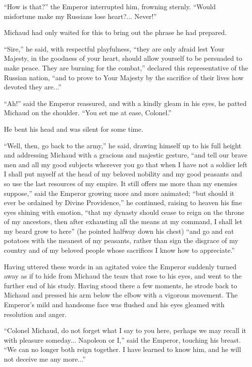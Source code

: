 ``How is that?'' the Emperor interrupted him, frowning
sternly. ``Would misfortune make my Russians lose
heart?... Never!''

Michaud had only waited for this to bring out the phrase he had
prepared.

``Sire,'' he said, with respectful playfulness, ``they are only
afraid lest Your Majesty, in the goodness of your heart, should
allow yourself to be persuaded to make peace. They are burning
for the combat,'' declared this representative of the Russian
nation, ``and to prove to Your Majesty by the sacrifice of their
lives how devoted they are...''

``Ah!'' said the Emperor reassured, and with a kindly gleam in
his eyes, he patted Michaud on the shoulder. ``You set me at
ease, Colonel.''

He bent his head and was silent for some time.

``Well, then, go back to the army,'' he said, drawing himself up
to his full height and addressing Michaud with a gracious and
majestic gesture, ``and tell our brave men and all my good
subjects wherever you go that when I have not a soldier left I
shall put myself at the head of my beloved nobility and my good
peasants and so use the last resources of my empire. It still
offers me more than my enemies suppose,'' said the Emperor
growing more and more animated; ``but should it ever be ordained
by Divine Providence,'' he continued, raising to heaven his fine
eyes shining with emotion, ``that my dynasty should cease to
reign on the throne of my ancestors, then after exhausting all
the means at my command, I shall let my beard grow to here'' (he
pointed halfway down his chest) ``and go and eat potatoes with
the meanest of my peasants, rather than sign the disgrace of my
country and of my beloved people whose sacrifices I know how to
appreciate.''

Having uttered these words in an agitated voice the Emperor
suddenly turned away as if to hide from Michaud the tears that
rose to his eyes, and went to the further end of his
study. Having stood there a few moments, he strode back to
Michaud and pressed his arm below the elbow with a vigorous
movement. The Emperor's mild and handsome face was flushed and
his eyes gleamed with resolution and anger.

``Colonel Michaud, do not forget what I say to you here, perhaps
we may recall it with pleasure someday... Napoleon or I,'' said
the Emperor, touching his breast. ``We can no longer both reign
together. I have learned to know him, and he will not deceive me
any more...''

